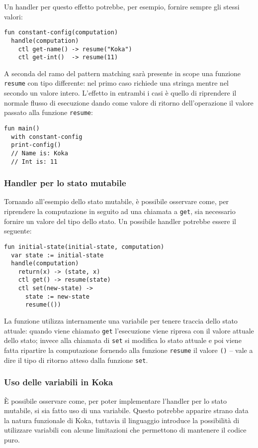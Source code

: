Un handler per questo effetto potrebbe, per esempio, fornire sempre gli stessi valori:
\begin{lstlisting}[language=koka]
fun constant-config(computation)
  handle(computation)
    ctl get-name() -> resume("Koka")
    ctl get-int()  -> resume(11)
\end{lstlisting}
A seconda del ramo del pattern matching sarà presente in scope una funzione \lstinline{resume} con tipo differente: nel primo caso richiede una stringa mentre nel secondo un valore intero.
L'effetto in entrambi i casi è quello di riprendere il normale flusso di esecuzione dando come valore di ritorno dell'operazione il valore passato alla funzione \lstinline{resume}:
\begin{lstlisting}[language=koka]
fun main()
  with constant-config
  print-config()
  // Name is: Koka
  // Int is: 11
\end{lstlisting}

\subsubsection{Handler per lo stato mutabile}
Tornando all'esempio dello stato mutabile, è possibile osservare come, per riprendere la computazione in seguito ad una chiamata a \lstinline{get}, sia necessario fornire un valore del tipo dello stato.
Un possibile handler potrebbe essere il seguente:
\begin{lstlisting}[language=koka]
fun initial-state(initial-state, computation)
  var state := initial-state
  handle(computation) 
    return(x) -> (state, x)
    ctl get() -> resume(state)
    ctl set(new-state) ->
      state := new-state
      resume(())
\end{lstlisting}

La funzione utilizza internamente una variabile per tenere traccia dello stato attuale: quando viene chiamato \lstinline{get} l'esecuzione viene ripresa con il valore attuale dello stato; invece alla chiamata di \lstinline{set} si modifica lo stato attuale e poi viene fatta ripartire la computazione fornendo alla funzione \lstinline{resume} il valore \lstinline{()} -- vale a dire il tipo di ritorno atteso dalla funzione \lstinline{set}.

\subsubsection{Uso delle variabili in Koka}
È possibile osservare come, per poter implementare l'handler per lo stato mutabile, si sia fatto uso di una variabile.
Questo potrebbe apparire strano data la natura funzionale di Koka, tuttavia il linguaggio introduce la possibilità di utilizzare variabili con alcune limitazioni che permettono di mantenere il codice puro.

